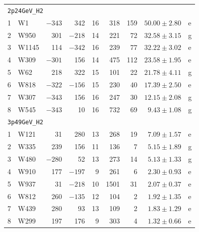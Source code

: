 \documentclass[11pt]{article}
\newcommand{\code}[1]{\texttt{#1}}
\begin{document}
\begin{table}[htbp]
\begin{tabular}{rlrrrrrrl}
\midrule
\multicolumn{9}{l}{\code{2p24GeV\_H2}} \\
1 & W1 & $-343$ & 342 & 16 & 318 & 159 & $50.00 \pm 2.80$ & e \\
2 & W950 & 301 & $-218$ & 14 & 221 & 72 & $32.58 \pm 3.15$ & g \\
3 & W1145 & 114 & $-342$ & 16 & 239 & 77 & $32.22 \pm 3.02$ & e \\
4 & W309 & $-301$ & 156 & 14 & 475 & 112 & $23.58 \pm 1.95$ & e \\
5 & W62 & 218 & 322 & 15 & 101 & 22 & $21.78 \pm 4.11$ & g \\
6 & W818 & $-322$ & $-156$ & 15 & 230 & 40 & $17.39 \pm 2.50$ & e \\
7 & W307 & $-343$ & 156 & 16 & 247 & 30 & $12.15 \pm 2.08$ & g \\
8 & W545 & $-343$ & 10 & 16 & 732 & 69 & $9.43 \pm 1.08$ & g \\
\midrule
\multicolumn{9}{l}{\code{3p49GeV\_H2}} \\
1 & W121 & 31 & 280 & 13 & 268 & 19 & $7.09 \pm 1.57$ & e \\
2 & W335 & 239 & 156 & 11 & 136 & 7 & $5.15 \pm 1.89$ & g \\
3 & W480 & $-280$ & 52 & 13 & 273 & 14 & $5.13 \pm 1.33$ & g \\
4 & W910 & 177 & $-197$ & 9 & 261 & 6 & $2.30 \pm 0.93$ & e \\
5 & W937 & 31 & $-218$ & 10 & 1501 & 31 & $2.07 \pm 0.37$ & e \\
6 & W812 & 260 & $-135$ & 12 & 104 & 2 & $1.92 \pm 1.35$ & e \\
7 & W439 & 280 & 93 & 13 & 109 & 2 & $1.83 \pm 1.29$ & e \\
8 & W299 & 197 & 176 & 9 & 303 & 4 & $1.32 \pm 0.66$ & e \\
\bottomrule
\end{tabular}
\end{table}
\end{document}
